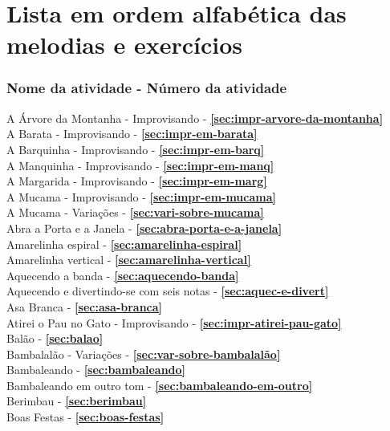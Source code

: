 
\section*{Lista em ordem alfabética das melodias e exercícios}
\label{sec:lista-ordem-alfabetica}

\subsubsection*{Nome da atividade - Número da atividade}

A Árvore da Montanha  - Improvisando - \textbf{\ref{sec:impr-arvore-da-montanha}}  \\
A Barata - Improvisando - \textbf{\ref{sec:impr-em-barata}} \\
A Barquinha - Improvisando - \textbf{\ref{sec:impr-em-barq}} \\
A Manquinha - Improvisando - \textbf{\ref{sec:impr-em-manq}} \\
A Margarida - Improvisando - \textbf{\ref{sec:impr-em-marg}} \\
A Mucama - Improvisando - \textbf{\ref{sec:impr-em-mucama}} \\
A Mucama - Variações - \textbf{\ref{sec:vari-sobre-mucama}} \\
Abra a Porta e a Janela - \textbf{\ref{sec:abra-porta-e-a-janela}} \\
Amarelinha espiral - \textbf{\ref{sec:amarelinha-espiral}} \\
Amarelinha vertical - \textbf{\ref{sec:amarelinha-vertical}} \\
Aquecendo a banda - \textbf{\ref{sec:aquecendo-banda}} \\
Aquecendo e divertindo-se com seis notas - \textbf{\ref{sec:aquec-e-divert}} \\
Asa Branca - \textbf{\ref{sec:asa-branca}} \\
Atirei o Pau no Gato - Improvisando - \textbf{\ref{sec:impr-atirei-pau-gato}} \\
Balão - \textbf{\ref{sec:balao}} \\
Bambalalão - Variações - \textbf{\ref{sec:var-sobre-bambalalão}} \\
Bambaleando - \textbf{\ref{sec:bambaleando}} \\
Bambaleando em outro tom - \textbf{\ref{sec:bambaleando-em-outro}} \\
Berimbau - \textbf{\ref{sec:berimbau}} \\
Boas Festas - \textbf{\ref{sec:boas-festas}} \\
